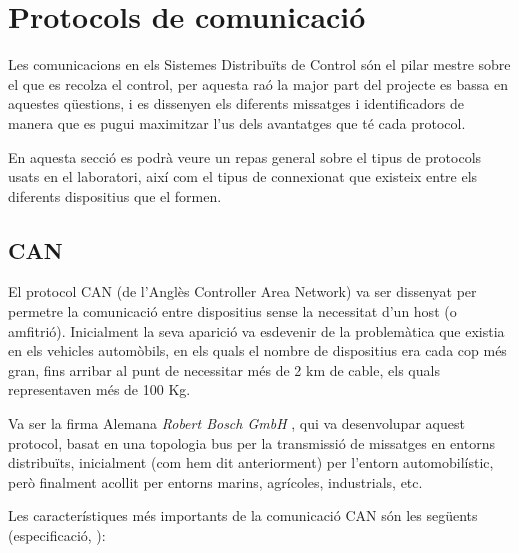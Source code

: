 \section{Protocols de comunicació}\label{cap:tec:prot}

Les comunicacions en els Sistemes Distribuïts de Control són el pilar mestre sobre el que es recolza el control, per aquesta raó la major part del projecte es bassa en aquestes qüestions, i es dissenyen els diferents missatges i identificadors de manera que es pugui maximitzar l'us dels avantatges que té cada protocol. 

En aquesta secció es podrà veure un repas general sobre el tipus de protocols usats en el laboratori, així com el tipus de connexionat que existeix entre els diferents dispositius que el formen.

\subsection{CAN}\label{cap:tec:prot:can}

El protocol CAN (de l'Anglès Controller Area Network) va ser dissenyat per permetre la comunicació entre dispositius sense la necessitat d'un host (o amfitrió). Inicialment la seva aparició va esdevenir de la problemàtica que existia en els vehicles automòbils, en els quals el nombre de dispositius era cada cop més gran, fins arribar al punt de necessitar més de 2 km de cable, els quals representaven més de 100 Kg.

Va ser la firma Alemana \emph{Robert Bosch GmbH} , qui va desenvolupar aquest protocol, basat en una topologia bus per la transmissió de missatges en entorns distribuïts, inicialment (com hem dit anteriorment) per l'entorn automobilístic, però finalment acollit per entorns marins, agrícoles, industrials, etc.

Les característiques més importants de la comunicació CAN són les següents (especificació,  \cite{Bosch1991}):

